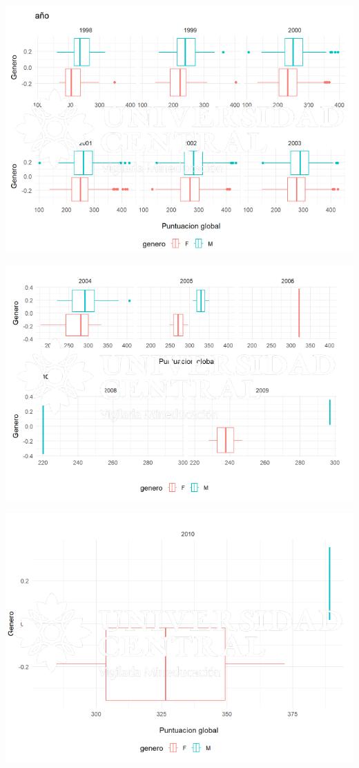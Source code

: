 \documentclass{article}
\begin{document}
\begin{center}
\includegraphics[scale=0.5]{Captura13.PNG} 
\end{center}
\begin{center}
\includegraphics[scale=0.5]{Captura14.PNG} 
\end{center}
\begin{center}
\includegraphics[scale=0.5]{Captura15.PNG} 
\end{center}
\end{document}
